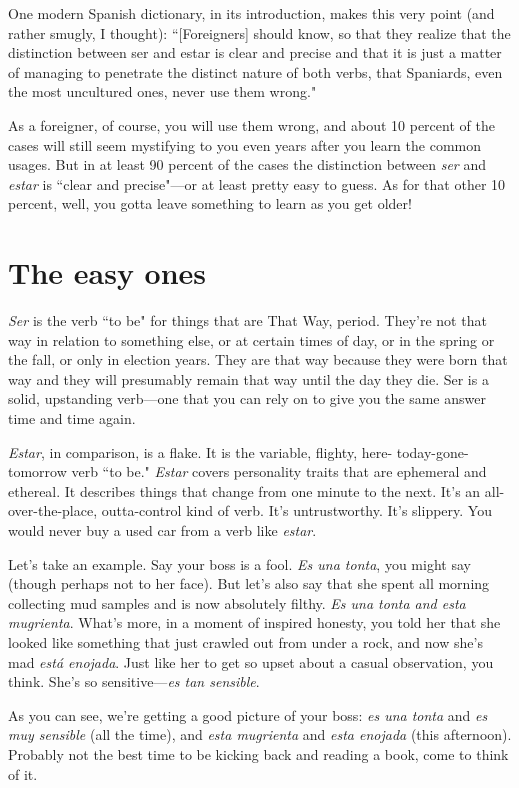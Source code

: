 One modern Spanish dictionary, in its introduction, makes
this very point (and rather smugly, I thought): ``[Foreigners] should
know, so that they realize that the distinction between ser and estar is
clear and precise and that it is just a matter of managing to penetrate
the distinct nature of both verbs, that Spaniards, even the most uncultured ones, never use them wrong."

As a foreigner, of course, you will use them wrong, and about
10 percent of the cases will still seem mystifying to you even years
after you learn the common usages. But in at least 90 percent of the
cases the distinction between \emph{ser} and \emph{estar} is ``clear and precise"---or
at least pretty easy to guess. As for that other 10 percent, well, you
gotta leave something to learn as you get older!

\section{The easy ones}

\emph{Ser} is the verb ``to be" for things that are That Way, period.
They're not that way in relation to something else, or at certain times
of day, or in the spring or the fall, or only in election years. They are
that way because they were born that way and they will presumably
remain that way until the day they die. Ser is a solid, upstanding
verb---one that you can rely on to give you the same answer time
and time again.

\emph{Estar}, in comparison, is a flake. It is the variable, flighty, here-
today-gone-tomorrow verb ``to be." \emph{Estar} covers personality traits that
are ephemeral and ethereal. It describes things that change from one
minute to the next. It's an all-over-the-place, outta-control kind of
verb. It's untrustworthy. It's slippery. You would never buy a used car
from a verb like \emph{estar}.

Let's take an example. Say your boss is a fool. \emph{Es una tonta},
you might say (though perhaps not to her face). But let's also say that
she spent all morning collecting mud samples and is now absolutely
filthy. \emph{Es una tonta and esta mugrienta}. What's more, in a moment of
inspired honesty, you told her that she looked like something that just
crawled out from under a rock, and now she's mad \emph{está enojada}. Just
like her to get so upset about a casual observation, you think. She's so
sensitive---\emph{es tan sensible}.

As you can see, we're getting a good picture of your boss: \emph{es
	una tonta} and \emph{es muy sensible} (all the time), and \emph{esta mugrienta} and
\emph{esta enojada} (this afternoon). Probably not the best time to be kicking
back and reading a book, come to think of it.

